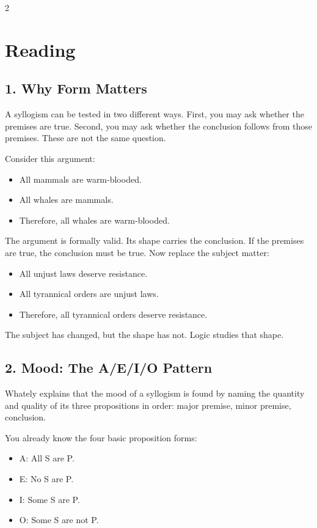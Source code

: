 \documentclass[12pt]{article}
\begin{document}
\begin{multicols}{2}
\section*{Reading}

\subsection*{1. Why Form Matters}
A syllogism can be tested in two different ways. First, you may ask whether the premises are true. Second, you may ask whether the conclusion follows from those premises. These are not the same question.

Consider this argument:
\begin{itemize}[leftmargin=*]
\item All mammals are warm-blooded.
\item All whales are mammals.
\item Therefore, all whales are warm-blooded.
\end{itemize}

The argument is formally valid. Its shape carries the conclusion. If the premises are true, the conclusion must be true. Now replace the subject matter:
\begin{itemize}[leftmargin=*]
\item All unjust laws deserve resistance.
\item All tyrannical orders are unjust laws.
\item Therefore, all tyrannical orders deserve resistance.
\end{itemize}

The subject has changed, but the shape has not. Logic studies that shape.

\subsection*{2. Mood: The A/E/I/O Pattern}
Whately explains that the mood of a syllogism is found by naming the quantity and quality of its three propositions in order: major premise, minor premise, conclusion.

You already know the four basic proposition forms:
\begin{itemize}[leftmargin=*]
\item A: All S are P.
\item E: No S are P.
\item I: Some S are P.
\item O: Some S are not P.
\end{itemize}


\end{multicols}
\end{document}
